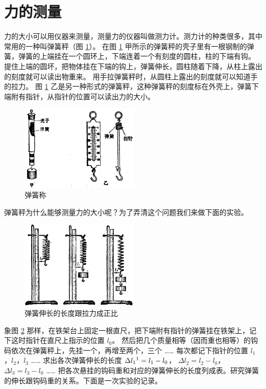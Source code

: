 \section{力的测量}\label{sec:2-4}

力的大小可以用仪器来测量，测量力的仪器叫做测力计。测力计的种类很多，其中常用的一种叫弹簧秤（图 \ref{fig:2-7}）。
在图 \ref{fig:2-7} 甲所示的弹簧秤的壳子里有一根钢制的弹簧，弹簧的上端挂在一个圆环上，下端连着一个有刻度的圆柱，柱的下端有钩。
提住上端的圆坏，把物体挂在下端的钩上，弹簧伸长，圆柱随着下降，从柱上露出的刻度就可以读出物重来。
用手拉弹簧秤时，从圆柱上露出的刻度就可以知道手的拉力。
图 \ref{fig:2-7} 乙是另一种形式的弹簧秤，这种弹簧秤的刻度标在外壳上，弹簧下端附有指针，从指针的位置可以读出力的大小。

\begin{figure}[htbp]
    \centering
    \includegraphics[width=0.5\textwidth]{../pic/czwl1-ch2-7}
    \caption{弹簧称}\label{fig:2-7}
\end{figure}

弹簧秤为什么能够测量力的大小呢？为了弄清这个问题我们来做下面的实验。

\begin{figure}[htbp]
    \centering
    \includegraphics[width=0.5\textwidth]{../pic/czwl1-ch2-8}
    \caption{弹簧伸长的长度跟拉力成正比}\label{fig:2-8}
\end{figure}

象图 \ref{fig:2-8} 那样，在铁架台上固定一根直尺，把下端附有指针的弹簧挂在铁架上，记下这时指针在直尺上指示的位置 $l_0$。
然后把几个质量相等（因而重也相等）的钩码依次在弹簧秤上，先挂一个，再增至两个，三个 ……  每次都记下指针的位置
$l_1$，$l_2$，$l_3$ ……  求出各次弹簧伸长的长度 $\Delta l_1 \footnotemark = l_1 - l_0$，
$\Delta l_2 = l_2 - l_0$，
$\Delta l_3 = l_3 - l_0$ ……
把各次悬挂的钩码重和对应的弹簧伸长的长度列成表。研究弹簧的伸长跟钩码重的关系。下面是一次实验的记录。

